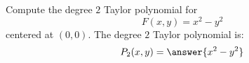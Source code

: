 \documentclass{ximera}
\author{Bart Snapp}
\begin{document}
\begin{exercise}
  Compute the degree $2$ Taylor polynomial for
  \[
  F(x,y) = x^2-y^2
  \]
  centered at $(0,0)$.  The degree $2$ Taylor polynomial is:
  \[
  P_2(x,y) =\answer{x^2-y^2}
  \]
\end{exercise}
\end{document}
